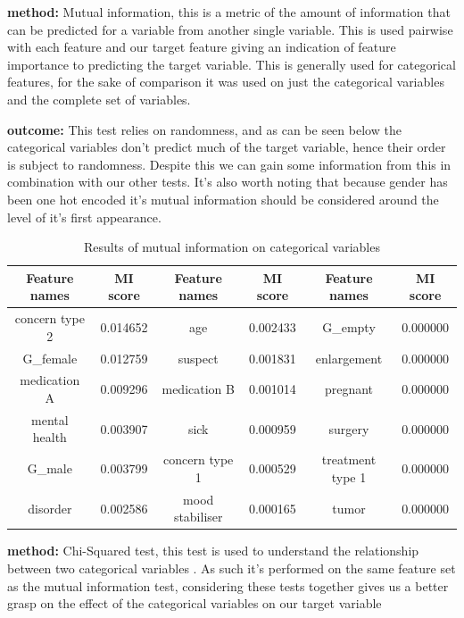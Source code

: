 \documentclass[a4paper]{article}
\begin{document}
\textbf{method:} Mutual information, this is a metric of the amount of information that can be predicted for a variable from another single variable. This is used pairwise with each feature and our target feature giving an indication of feature importance to predicting the target variable. This is generally used for categorical features, for the sake of comparison it was used on just the categorical variables and the complete set of variables.

\textbf{outcome:} This test relies on randomness, and as can be seen below the categorical variables don't predict much of the target variable, hence their order is subject to randomness. Despite this we can gain some information from this in combination with our other tests. It's also worth noting that because gender has been one hot encoded it's mutual information should be considered around the level of it's first appearance.

\begin{table}[h]
\begin{adjustwidth}{-0.5cm}{}
    \centering
    \begin{tabular}{|c|c|c|c|c|c|}
    \hline
       Feature names  & MI score & Feature names   & MI score & Feature names    & MI score \\
    \hline
       concern type 2 & 0.014652 & age             & 0.002433 & G\_empty         & 0.000000 \\
    \hline
       G\_female      & 0.012759 & suspect         & 0.001831 & enlargement      & 0.000000 \\
    \hline
       medication A   & 0.009296 & medication B    & 0.001014 & pregnant         & 0.000000 \\
    \hline
       mental health  & 0.003907 & sick            & 0.000959 & surgery          & 0.000000 \\
    \hline
       G\_male        & 0.003799 & concern type 1  & 0.000529 & treatment type 1 & 0.000000 \\
    \hline 
       disorder       & 0.002586 & mood stabiliser & 0.000165 & tumor            & 0.000000\\
    \hline
    \end{tabular}
    \caption{Results of mutual information on categorical variables}
    \label{tab:mutual info}
\end{adjustwidth}
\end{table}

\textbf{method:} Chi-Squared test, this test is used to understand the relationship between two categorical variables \cite{Bobbitt2020}. As such it's performed on the same feature set as the mutual information test, considering these tests together gives us a better grasp on the effect of the categorical variables on our target variable
\end{document}
